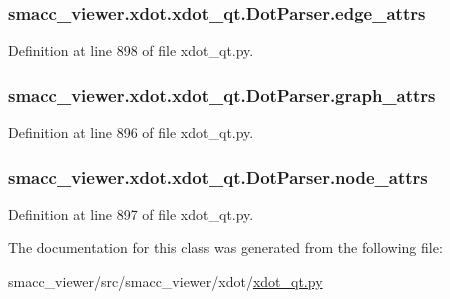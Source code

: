 \subsubsection[{\texorpdfstring{edge\+\_\+attrs}{edge_attrs}}]{\setlength{\rightskip}{0pt plus 5cm}smacc\+\_\+viewer.\+xdot.\+xdot\+\_\+qt.\+Dot\+Parser.\+edge\+\_\+attrs}\hypertarget{classsmacc__viewer_1_1xdot_1_1xdot__qt_1_1DotParser_a04f8665be18e4294a4fcbff16af46875}{}\label{classsmacc__viewer_1_1xdot_1_1xdot__qt_1_1DotParser_a04f8665be18e4294a4fcbff16af46875}


Definition at line 898 of file xdot\+\_\+qt.\+py.

\subsubsection[{\texorpdfstring{graph\+\_\+attrs}{graph_attrs}}]{\setlength{\rightskip}{0pt plus 5cm}smacc\+\_\+viewer.\+xdot.\+xdot\+\_\+qt.\+Dot\+Parser.\+graph\+\_\+attrs}\hypertarget{classsmacc__viewer_1_1xdot_1_1xdot__qt_1_1DotParser_a6c0ab180a279f53f444beedc72c76756}{}\label{classsmacc__viewer_1_1xdot_1_1xdot__qt_1_1DotParser_a6c0ab180a279f53f444beedc72c76756}


Definition at line 896 of file xdot\+\_\+qt.\+py.

\subsubsection[{\texorpdfstring{node\+\_\+attrs}{node_attrs}}]{\setlength{\rightskip}{0pt plus 5cm}smacc\+\_\+viewer.\+xdot.\+xdot\+\_\+qt.\+Dot\+Parser.\+node\+\_\+attrs}\hypertarget{classsmacc__viewer_1_1xdot_1_1xdot__qt_1_1DotParser_a18cee9aea7e7d2501b98b43ffe3cf128}{}\label{classsmacc__viewer_1_1xdot_1_1xdot__qt_1_1DotParser_a18cee9aea7e7d2501b98b43ffe3cf128}


Definition at line 897 of file xdot\+\_\+qt.\+py.



The documentation for this class was generated from the following file\+:\begin{DoxyCompactItemize}
\item 
smacc\+\_\+viewer/src/smacc\+\_\+viewer/xdot/\hyperlink{xdot__qt_8py}{xdot\+\_\+qt.\+py}\end{DoxyCompactItemize}
